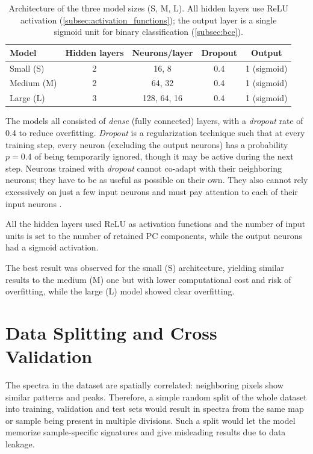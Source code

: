 \begin{table}[ht]
    \centering
    \small
    \begin{tabular}{|l|c|c|c|c|}
        \hline
        \textbf{Model} & \textbf{Hidden layers} & \textbf{Neurons/layer} & \textbf{Dropout} & \textbf{Output} \\
        \hline
        Small (S)  & 2 & 16, 8      & 0.4 & 1 (sigmoid) \\
        Medium (M) & 2 & 64, 32      & 0.4 & 1 (sigmoid) \\
        Large (L)  & 3 & 128, 64, 16 & 0.4  & 1 (sigmoid) \\
        \hline
    \end{tabular}
    \caption{Architecture of the three model sizes (S, M, L). All hidden layers use ReLU activation (\cref{subsec:activation_functions}); the output layer is a single sigmoid unit for binary classification (\cref{subsec:bce}).}
    \label{tab:architectures}
\end{table}

The models all consisted of \textit{dense} (fully connected) layers, with a \textit{dropout} rate of 0.4 to reduce overfitting. \textit{Dropout} is a regularization technique such that at every training step, every neuron (excluding the output neurons) has a probability $p=0.4$ of being temporarily ignored, though it may be active during the next step. Neurons trained with \textit{dropout} cannot co-adapt with their neighboring neurons; they have to be as useful as possible on their own. They also cannot rely excessively on just a few input neurons and must pay attention to each of their input neurons \cite{geron2022hands}.

All the hidden layers used ReLU as activation functions and the number of input units is set to the number of retained PC components, while the output neurons had a sigmoid activation.

The best result was observed for the small (S) architecture, yielding similar results to the medium (M) one but with lower computational cost and risk of overfitting, while the large (L) model showed clear overfitting.


\section{Data Splitting and Cross Validation}
\label{sec:data_splitting}

The spectra in the dataset are spatially correlated: neighboring pixels show similar patterns and peaks. Therefore, a simple random split of the whole dataset into training, validation and test sets would result in spectra from the same map or sample being present in multiple divisions. Such a split would let the model memorize sample-specific signatures and give misleading results due to data leakage.

